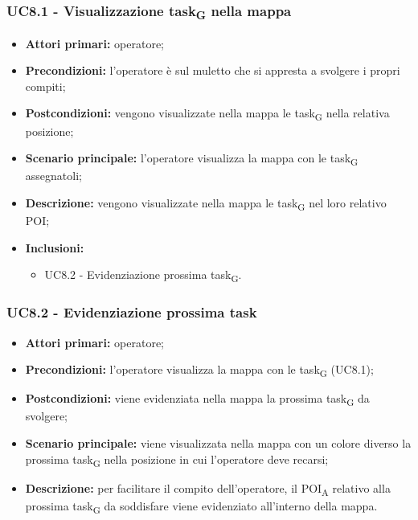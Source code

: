 \subsubsection{UC8.1 - Visualizzazione \gls{task}\textsubscript{G} nella mappa}
\begin{itemize}
	\item 	\textbf{Attori primari:} operatore;
	\item 	\textbf{Precondizioni:} l’operatore è sul muletto che si appresta a svolgere i propri compiti;
	\item 	\textbf{Postcondizioni:} vengono visualizzate nella mappa le \gls{task}\textsubscript{G} nella relativa posizione;
	\item 	\textbf{Scenario principale:} l’operatore visualizza la mappa con le \gls{task}\textsubscript{G} assegnatoli;
	\item 	\textbf{Descrizione:} vengono visualizzate nella mappa le \gls{task}\textsubscript{G} nel loro relativo POI;
	\item 	\textbf{Inclusioni:}
	\begin{itemize}
		\item UC8.2 - Evidenziazione prossima \gls{task}\textsubscript{G}.
	\end{itemize}
\end{itemize}

\subsubsection{UC8.2 - Evidenziazione prossima task}
\begin{itemize}
	\item 	\textbf{Attori primari:} operatore;
	\item 	\textbf{Precondizioni:} l’operatore visualizza la mappa con le \gls{task}\textsubscript{G} (UC8.1);
	\item 	\textbf{Postcondizioni:} viene evidenziata nella mappa la prossima \gls{task}\textsubscript{G} da svolgere;
	\item 	\textbf{Scenario principale:} viene visualizzata nella mappa con un colore diverso la prossima \gls{task}\textsubscript{G} nella posizione in cui l’operatore deve recarsi;
	\item 	\textbf{Descrizione:} per facilitare il compito dell’operatore, il  \acrshort{POI}\textsubscript{A} relativo alla prossima \gls{task}\textsubscript{G} da soddisfare viene evidenziato all’interno della mappa.

\end{itemize}

